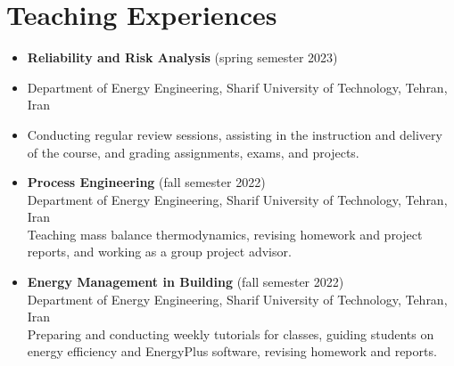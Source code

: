 \documentclass[letter,20pt]{article}
\begin{document}
\section{\textbf{Teaching Experiences}} 	    
\vspace{5pt}

\begin{itemize}[noitemsep, topsep=6pt, after=\vspace{-0.5 mm},leftmargin = 0ex,rightmargin=1ex]
	
	\small \item[]  \textbf {Reliability and Risk Analysis} (spring semester 2023)\\
    \small \item[] Department of Energy Engineering, Sharif University of Technology, Tehran, Iran \\
    \small \item[] \justifying Conducting regular review sessions, assisting in the instruction and delivery of the course, and grading assignments, exams, and projects.\vspace{6pt}


    \small \item[]  \textbf {Process Engineering} (fall semester 2022)\\
    Department of Energy Engineering, Sharif University of Technology, Tehran, Iran \\
    \justifying Teaching mass balance thermodynamics, revising homework and project reports, and working as a group project advisor.\vspace{6pt}


    \small \item[]  \textbf {Energy Management in Building} (fall semester 2022)\\
    Department of Energy Engineering, Sharif University of Technology, Tehran, Iran \\
    \justifying Preparing and conducting weekly tutorials for classes, guiding students on energy efficiency and EnergyPlus software, revising homework and reports.

\end{itemize}
\end{document}
